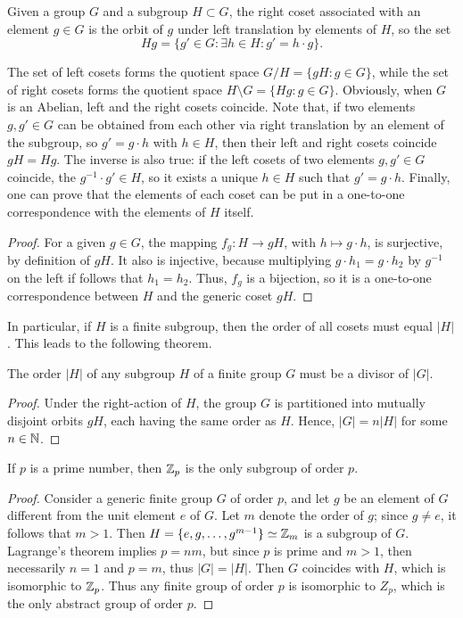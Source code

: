 \begin{defn}
    Given a group $G$ and a subgroup $H \subset G$, the right coset associated with an element $g \in G$ is the orbit of $g$ under left translation by elements of $H$, so the set 
    \begin{equation}
        Hg = \{g' \in G : \exists h \in H : g' = h \cdot g\}.
    \end{equation}
\end{defn}
The set of left cosets forms the quotient space $G/H = \{gH : g \in G\}$, while the set of right cosets forms the quotient space $H\setminus G = \{Hg : g \in G\}$. Obviously, when $G$ is an Abelian, left and the right cosets coincide. Note that, if two elements $g,g' \in G$ can be obtained from each other via right translation by an element of the subgroup, so $g' = g\cdot h$ with $h \in H$, then their left and right cosets coincide $gH = Hg$. The inverse is also true: if the left cosets of two elements $g,g'\in G$ coincide, the $g^{-1}\cdot g' \in H$, so it exists a unique $h \in H$ such that $g' = g\cdot h$. Finally, one can prove that the elements of each coset can be put in a one-to-one correspondence with the elements of $H$ itself. 
\begin{proof}
    For a given $g \in G$, the mapping $f_g : H \to gH$, with $h \mapsto g\cdot h$, is surjective, by definition of $gH$. It also is injective, because multiplying $g\cdot h_1 = g\cdot h_2$ by $g^{-1}$ on the left if follows that $h_1 = h_2$. Thus, $f_g$ is a bijection, so it is a one-to-one correspondence between $H$ and the generic coset $gH$.
\end{proof}
In particular, if $H$ is a finite subgroup, then the order of all cosets must equal $|H|$. This leads to the following theorem. 
\begin{teo}
\label{teo: Lagrange's theorem}
    The order $|H|$ of any subgroup $H$ of a finite group $G$ must be a divisor of $|G|$.
\end{teo}
\begin{proof}
    Under the right-action of $H$, the group $G$ is partitioned into mutually disjoint orbits $gH$, each having the same order as $H$. Hence, $|G| = n|H|$ for some $n \in \mathbb{N}$.
\end{proof}
\begin{corl}
    If $p$ is a prime number, then $\mathbb{Z}_p$ is the only subgroup of order $p$.
\end{corl}
\begin{proof}
    Consider a generic finite group $G$ of order $p$, and let $g$ be an element of $G$ different from the unit element $e$ of $G$. Let $m$ denote the order of $g$; since $g \neq e$, it follows that $m > 1$. Then $H = \{e,g,\dots,g^{m - 1}\} \simeq \mathbb{Z}_m$ is a subgroup of $G$. Lagrange's theorem implies $p = nm$, but since $p$ is prime and $m  > 1$, then necessarily $n = 1$ and $p = m$, thus $|G| = |H|$. Then $G$ coincides with $H$, which is isomorphic to $\mathbb{Z}_p$. Thus any finite group of order $p$ is isomorphic to $Z_p$, which is the only abstract group of order $p$.
\end{proof}
